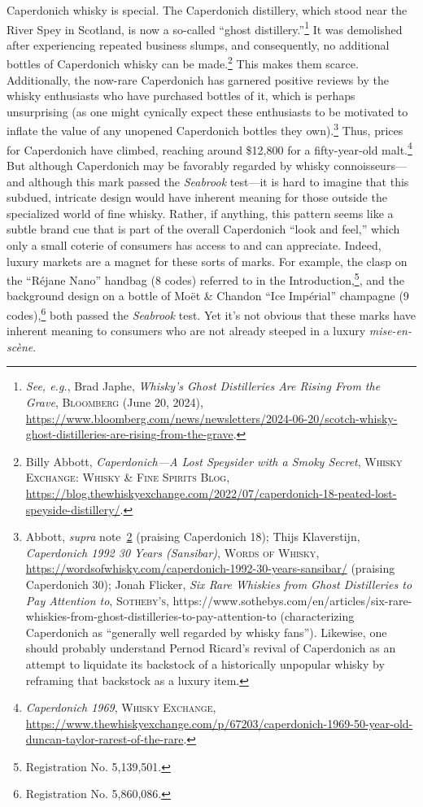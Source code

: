 \documentclass[letterpaper, 11pt, oneside]{article}
\begin{document}
\noindent Caperdonich whisky is special. The Caperdonich distillery, which stood near the River Spey in Scotland, is now a so-called ``ghost distillery.''\footnote{\textit{See, e.g.}, Brad Japhe, \textit{Whisky's Ghost Distilleries Are Rising From the Grave}, \textsc{Bloomberg} (June 20, 2024), \url{https://www.bloomberg.com/news/newsletters/2024-06-20/scotch-whisky-ghost-distilleries-are-rising-from-the-grave}.} It was demolished after experiencing repeated business slumps, and consequently, no additional bottles of Caperdonich whisky can be made.\footnote{\label{supra20} Billy Abbott, \textit{Caperdonich—A Lost Speysider with a Smoky Secret}, \textsc{Whisky Exchange: Whisky \& Fine Spirits Blog}, \url{https://blog.thewhiskyexchange.com/2022/07/caperdonich-18-peated-lost-speyside-distillery/}.} This makes them scarce. Additionally, the now-rare Caperdonich has garnered positive reviews by the whisky enthusiasts who have purchased bottles of it, which is perhaps unsurprising (as one might cynically expect these enthusiasts to be motivated to inflate the value of any unopened Caperdonich bottles they own).\footnote{Abbott, \textit{supra} note~\ref{supra20} (praising Caperdonich 18); Thijs Klaverstijn, \textit{Caperdonich 1992 30 Years (Sansibar)}, \textsc{Words of Whisky}, \url{https://wordsofwhisky.com/caperdonich-1992-30-years-sansibar/} (praising Caperdonich 30); Jonah Flicker, \textit{Six Rare Whiskies from Ghost Distilleries to Pay Attention to}, \textsc{Sotheby's}, https://www.sothebys.com/en/articles/six-rare-whiskies-from-ghost-distilleries-to-pay-attention-to (characterizing Caperdonich as ``generally well regarded by whisky fans''). Likewise, one should probably understand Pernod Ricard's revival of Caperdonich as an attempt to liquidate its backstock of a historically unpopular whisky by reframing that backstock as a luxury item.} Thus, prices for Caperdonich have climbed, reaching around \$12,800 for a fifty-year-old malt.\footnote{\textit{Caperdonich 1969}, \textsc{Whisky Exchange}, \url{https://www.thewhiskyexchange.com/p/67203/caperdonich-1969-50-year-old-duncan-taylor-rarest-of-the-rare}.} But although Caperdonich may be favorably regarded by whisky connoisseurs—and although this mark passed the \textit{Seabrook} test—it is hard to imagine that this subdued, intricate design would have inherent meaning for those outside the specialized world of fine whisky. Rather, if anything, this pattern seems like a subtle brand cue that is part of the overall Caperdonich ``look and feel,'' which only a small coterie of consumers has access to and can appreciate. Indeed, luxury markets are a magnet for these sorts of marks. For example, the clasp on the ``Réjane Nano'' handbag (8 codes) referred to in the Introduction,\footnote{Registration No. 5,139,501.}, and the background design on a bottle of Moët \& Chandon ``Ice Impérial'' champagne (9 codes),\footnote{Registration No. 5,860,086.} both passed the \textit{Seabrook} test. Yet it's not obvious that these marks have inherent meaning to consumers who are not already steeped in a luxury \textit{mise-en-scène}.
\end{document}
